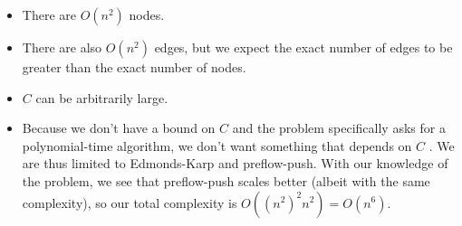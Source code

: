 
\begin{itemize}
\item There are $O(n^2)$ nodes.
\item There are also $O(n^2)$ edges, but we expect the exact number of edges to be greater than the exact number of nodes.
\item $C$ can be arbitrarily large.
\item Because we don’t have a bound on $C$ and the problem specifically asks for a polynomial-time algorithm,
we don’t want something that depends on $C$ . We are thus limited to Edmonds-Karp and preflow-push. With our knowledge of the problem, we see that preflow-push scales better (albeit with the same complexity), so our total complexity is $O((n^2)^2 n^2) = O(n^6)$.  
\end{itemize}




